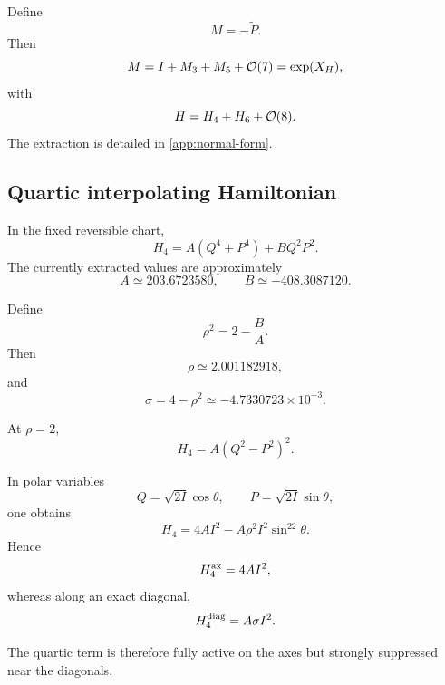 Define
\[
M=-\widetilde P.
\]
Then
\[
M
=
I+M_3+M_5+\mathcal{O}(7)
=
\exp(X_H),
\]
with
\[
H=H_4+H_6+\mathcal{O}(8).
\]
The extraction is detailed in \cref{app:normal-form}.

\subsection{Quartic interpolating Hamiltonian}

In the fixed reversible chart,
\begin{equation}
\boxed{
H_4
=
A(Q^4+P^4)+BQ^2P^2.
}
\label{eq:H4}
\end{equation}
The currently extracted values are approximately
\[
A\simeq203.6723580,\qquad B\simeq-408.3087120.
\]

Define
\begin{equation}
\boxed{
\rho^2=2-\frac BA.
}
\label{eq:rho-def}
\end{equation}
Then
\[
\rho\simeq2.001182918,
\]
and
\begin{equation}
\boxed{
\sigma=4-\rho^2\simeq-4.7330723\times10^{-3}.
}
\label{eq:sigma-def}
\end{equation}

At \(\rho=2\),
\[
H_4=A(Q^2-P^2)^2.
\]

In polar variables
\[
Q=\sqrt{2I}\cos\theta,\qquad
P=\sqrt{2I}\sin\theta,
\]
one obtains
\[
H_4
=
4AI^2-A\rho^2I^2\sin^22\theta.
\]
Hence
\[
H_4^{\rm ax}=4AI^2,
\]
whereas along an exact diagonal,
\[
H_4^{\rm diag}=A\sigma I^2.
\]

The quartic term is therefore fully active on the axes but strongly suppressed near the diagonals.
